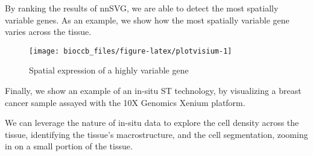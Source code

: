 By ranking the results of nnSVG, we are able to detect the most spatially
variable genes. As an example, we show how the most spatially variable gene varies
across the tissue.

\begin{Shaded}
\begin{Highlighting}[]
 \NormalTok{, }\NormalTok{)}
\end{Highlighting}
\end{Shaded}

\begin{figure}
\texttt{[image: bioccb\_files/figure-latex/plotvisium-1]} \caption{Spatial expression of a highly variable gene}\label{fig:plotvisium}
\end{figure}

Finally, we show an example of an in-situ ST technology, by visualizing a breast
cancer sample assayed with the 10X Genomics Xenium platform.

\begin{Shaded}
\begin{Highlighting}[]
\StringTok{ }\NormalTok{(}\NormalTok{)}
\CommentTok{\#\# }
\CommentTok{\#\# }
\end{Highlighting}
\end{Shaded}

We can leverage the nature of in-situ data to explore the cell density across the
tissue, identifying the tissue's macrostructure, and the cell segmentation,
zooming in on a small portion of the tissue.

